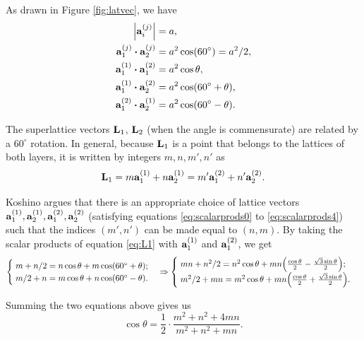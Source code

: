 \documentclass[a4paper,12pt]{report}
\begin{document}
As drawn in Figure \ref{fig:latvec}, we have
\begin{align}
\label{eq:scalarprods0}
\abs{\a_i^{(j)}} &= a, \\
\label{eq:scalarprods1}
\vb{a}_1^{(j)} \vdot \vb{a}_2^{(j)} &= a^2 \cos(60^\circ) = a^2/2, \\
\label{eq:scalarprods2}
\vb{a}_1^{(1)} \vdot \vb{a}_1^{(2)} &= a^2 \cos\theta, \\
\label{eq:scalarprods3}
\vb{a}_1^{(1)} \vdot \vb{a}_2^{(2)} &= a^2 \cos(60^\circ + \theta), \\
\label{eq:scalarprods4}
\vb{a}_1^{(2)} \vdot \vb{a}_2^{(1)} &= a^2 \cos(60^\circ - \theta).
\end{align}

The superlattice vectors $\vb{L}_1$, $\vb{L}_2$ (when the angle is commensurate) are related by a $60^\circ$ rotation. In general, because $\vb{L}_1$ is a point that belongs to the lattices of both layers, it is written by integers $m,n,m',n'$ as
\begin{equation} \label{eq:L1}
\vb{L}_1 = m\vb{a}_1^{(1)} + n\vb{a}_2^{(1)} = m'\vb{a}_1^{(2)} + n'\vb{a}_2^{(2)}.
\end{equation}

Koshino \cite{koshino2012} argues that there is an appropriate choice of lattice vectors $\vb{a}_1^{(1)}, \vb{a}_2^{(1)}, \vb{a}_1^{(2)}, \vb{a}_2^{(2)}$ (satisfying equations \ref{eq:scalarprods0} to \ref{eq:scalarprods4}) such that the indices $(m',n')$ can be made equal to $(n,m)$. By taking the scalar products of equation \ref{eq:L1} with $\vb{a}_1^{(1)}$ and $\vb{a}_1^{(2)}$, we get
$$
\begin{cases}
\; m + n/2 = n \cos\theta + m \cos(60^\circ + \theta); \\
\; m/2 + n = m \cos\theta + n \cos(60^\circ - \theta).
\end{cases}
\Rightarrow
\begin{cases}
\; mn + n^2/2 = n^2 \cos\theta + mn \qty(\frac{\cos\theta}{2}
- \frac{\sqrt{3} \sin\theta}{2}); \\
\; m^2/2 + mn = m^2 \cos\theta + mn \qty(\frac{\cos\theta}{2}
+ \frac{\sqrt{3} \sin\theta}{2}).
\end{cases}
$$

Summing the two equations above gives us
\begin{equation} \label{eq:costheta}
\boxed{\cos\theta = \frac{1}{2} \cdot \frac{m^2 + n^2 + 4mn}{m^2 + n^2 + mn}.}
\end{equation}
\end{document}
